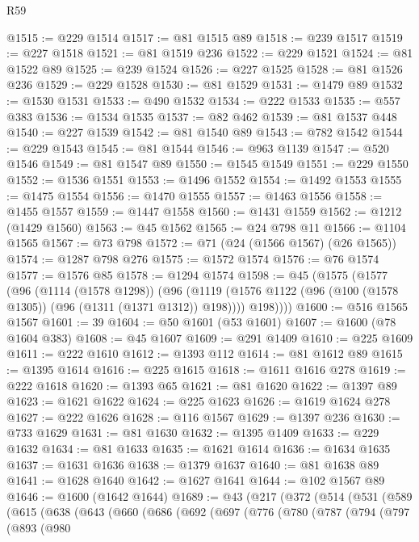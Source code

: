 \begin{lexlean}{R59}
\begin{coremodule}
@1515 := @229 @1514
@1517 := @81 @1515 @89
@1518 := @239 @1517
@1519 := @227 @1518
@1521 := @81 @1519 @236
@1522 := @229 @1521
@1524 := @81 @1522 @89
@1525 := @239 @1524
@1526 := @227 @1525
@1528 := @81 @1526 @236
@1529 := @229 @1528
@1530 := @81 @1529
@1531 := @1479 @89
@1532 := @1530 @1531
@1533 := @490 @1532
@1534 := @222 @1533
@1535 := @557 @383
@1536 := @1534 @1535
@1537 := @82 @462
@1539 := @81 @1537 @448
@1540 := @227 @1539
@1542 := @81 @1540 @89
@1543 := @782 @1542
@1544 := @229 @1543
@1545 := @81 @1544
@1546 := @963 @1139
@1547 := @520 @1546
@1549 := @81 @1547 @89
@1550 := @1545 @1549
@1551 := @229 @1550
@1552 := @1536 @1551
@1553 := @1496 @1552
@1554 := @1492 @1553
@1555 := @1475 @1554
@1556 := @1470 @1555
@1557 := @1463 @1556
@1558 := @1455 @1557
@1559 := @1447 @1558
@1560 := @1431 @1559
@1562 := @1212 (@1429 @1560)
@1563 := @45 @1562
@1565 := @24 @798 @11
@1566 := @1104 @1565
@1567 := @73 @798
@1572 := @71 (@24 (@1566 @1567) (@26 @1565))
@1574 := @1287 @798 @276
@1575 := @1572 @1574
@1576 := @76 @1574
@1577 := @1576 @85
@1578 := @1294 @1574
@1598 := @45
    (@1575
      (@1577
        (@96
          (@1114 (@1578 @1298))
          (@96
            (@1119 (@1576 @1122 (@96 (@100 (@1578 @1305)) (@96 (@1311 (@1371 @1312)) @198))))
            @198))))
@1600 := @516 @1565 @1567
@1601 := 39
@1604 := @50 @1601 (@53 @1601)
@1607 := @1600 (@78 @1604 @383)
@1608 := @45 @1607
@1609 := @291 @1409
@1610 := @225 @1609
@1611 := @222 @1610
@1612 := @1393 @112
@1614 := @81 @1612 @89
@1615 := @1395 @1614
@1616 := @225 @1615
@1618 := @1611 @1616 @278
@1619 := @222 @1618
@1620 := @1393 @65
@1621 := @81 @1620
@1622 := @1397 @89
@1623 := @1621 @1622
@1624 := @225 @1623
@1626 := @1619 @1624 @278
@1627 := @222 @1626
@1628 := @116 @1567
@1629 := @1397 @236
@1630 := @733 @1629
@1631 := @81 @1630
@1632 := @1395 @1409
@1633 := @229 @1632
@1634 := @81 @1633
@1635 := @1621 @1614
@1636 := @1634 @1635
@1637 := @1631 @1636
@1638 := @1379 @1637
@1640 := @81 @1638 @89
@1641 := @1628 @1640
@1642 := @1627 @1641
@1644 := @102 @1567 @89
@1646 := @1600 (@1642 @1644)
@1689 := @43
    (@217
      (@372
        (@514
          (@531
            (@589
              (@615
                (@638
                  (@643
                    (@660
                      (@686
                        (@692
                          (@697
                            (@776
                              (@780
                                (@787
                                  (@794
                                    (@797
                                      (@893
                                        (@980

\end{coremodule}
\end{lexlean}
